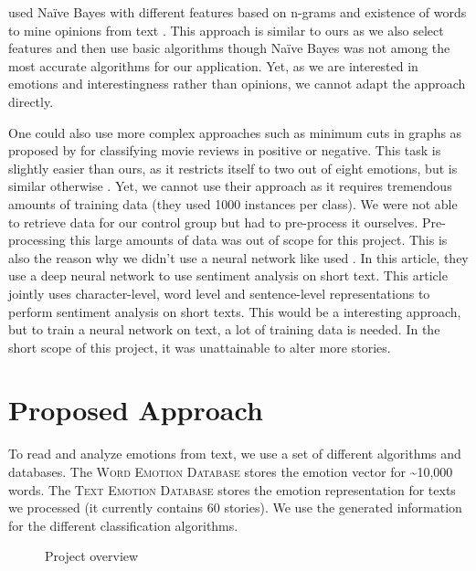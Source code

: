 \documentclass[letterpaper]{article}
\begin{document}
\citeauthor{Yu2003} used Na\"{i}ve Bayes with different features based on n-grams and existence of words to mine opinions from text \cite{Yu2003}. This approach is similar to ours as we also select features and then use basic algorithms though Na\"{i}ve Bayes was not among the most accurate algorithms for our application. Yet, as we are interested in emotions and interestingness rather than opinions, we cannot adapt the approach directly. 

One could also use more complex approaches such as minimum cuts in graphs as proposed by \citeauthor{pang2004sentimental} for classifying movie reviews in positive or negative. This task is slightly easier than ours, as it restricts itself to two out of eight emotions, but is similar otherwise \cite{pang2004sentimental}. Yet, we cannot use their approach as it requires tremendous amounts of training data (they used 1000 instances per class). We were not able to retrieve data for our control group but had to pre-process it ourselves. Pre-processing this large amounts of data was out of scope for this project. 
This is also the reason why we didn't use a neural network like \citeauthor{dos2014deep} used \cite{dos2014deep}. In this article, they use a deep neural network to use sentiment analysis on short text. This article jointly uses character-level, word level and sentence-level representations to perform sentiment analysis on short texts. This would be a interesting approach, but to train a neural network on text, a lot of training data is needed. In the short scope of this project, it was unattainable to alter more stories. 

\section{Proposed Approach}
To read and analyze emotions from text, we use a set of different algorithms and databases. The \textsc{Word Emotion Database} stores the emotion vector for \textasciitilde 10,000 words. The \textsc{Text Emotion Database} stores the emotion representation for texts we processed (it currently contains 60 stories). We use the generated information for the different classification algorithms. %

\begin{figure}[thpb]
      \centering
      \caption{Project overview}
      \label{figure:overview}
   \end{figure}
\end{document}
